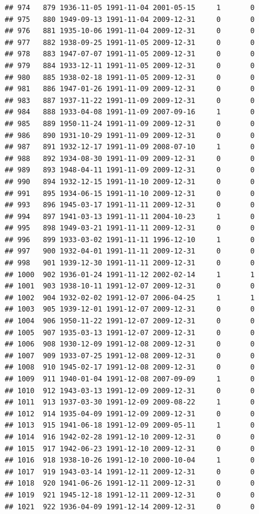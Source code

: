 \documentclass[
]{book}
\begin{document}
\begin{verbatim}
## 974   879 1936-11-05 1991-11-04 2001-05-15     1       0
## 975   880 1949-09-13 1991-11-04 2009-12-31     0       0
## 976   881 1935-10-06 1991-11-04 2009-12-31     0       0
## 977   882 1938-09-25 1991-11-05 2009-12-31     0       0
## 978   883 1947-07-07 1991-11-05 2009-12-31     0       0
## 979   884 1933-12-11 1991-11-05 2009-12-31     0       0
## 980   885 1938-02-18 1991-11-05 2009-12-31     0       0
## 981   886 1947-01-26 1991-11-09 2009-12-31     0       0
## 983   887 1937-11-22 1991-11-09 2009-12-31     0       0
## 984   888 1933-04-08 1991-11-09 2007-09-16     1       0
## 985   889 1950-11-24 1991-11-09 2009-12-31     0       0
## 986   890 1931-10-29 1991-11-09 2009-12-31     0       0
## 987   891 1932-12-17 1991-11-09 2008-07-10     1       0
## 988   892 1934-08-30 1991-11-09 2009-12-31     0       0
## 989   893 1948-04-11 1991-11-09 2009-12-31     0       0
## 990   894 1932-12-15 1991-11-10 2009-12-31     0       0
## 991   895 1934-06-15 1991-11-10 2009-12-31     0       0
## 993   896 1945-03-17 1991-11-11 2009-12-31     0       0
## 994   897 1941-03-13 1991-11-11 2004-10-23     1       0
## 995   898 1949-03-21 1991-11-11 2009-12-31     0       0
## 996   899 1933-03-02 1991-11-11 1996-12-10     1       0
## 997   900 1932-04-01 1991-11-11 2009-12-31     0       0
## 998   901 1939-12-30 1991-11-11 2009-12-31     0       0
## 1000  902 1936-01-24 1991-11-12 2002-02-14     1       1
## 1001  903 1938-10-11 1991-12-07 2009-12-31     0       0
## 1002  904 1932-02-02 1991-12-07 2006-04-25     1       1
## 1003  905 1939-12-01 1991-12-07 2009-12-31     0       0
## 1004  906 1950-11-22 1991-12-07 2009-12-31     0       0
## 1005  907 1935-03-13 1991-12-07 2009-12-31     0       0
## 1006  908 1930-12-09 1991-12-08 2009-12-31     0       0
## 1007  909 1933-07-25 1991-12-08 2009-12-31     0       0
## 1008  910 1945-02-17 1991-12-08 2009-12-31     0       0
## 1009  911 1940-01-04 1991-12-08 2007-09-09     1       0
## 1010  912 1943-03-13 1991-12-09 2009-12-31     0       0
## 1011  913 1937-03-30 1991-12-09 2009-08-22     1       0
## 1012  914 1935-04-09 1991-12-09 2009-12-31     0       0
## 1013  915 1941-06-18 1991-12-09 2009-05-11     1       0
## 1014  916 1942-02-28 1991-12-10 2009-12-31     0       0
## 1015  917 1942-06-23 1991-12-10 2009-12-31     0       0
## 1016  918 1938-10-26 1991-12-10 2000-10-04     1       0
## 1017  919 1943-03-14 1991-12-11 2009-12-31     0       0
## 1018  920 1941-06-26 1991-12-11 2009-12-31     0       0
## 1019  921 1945-12-18 1991-12-11 2009-12-31     0       0
## 1021  922 1936-04-09 1991-12-14 2009-12-31     0       0

\end{verbatim}
\end{document}
